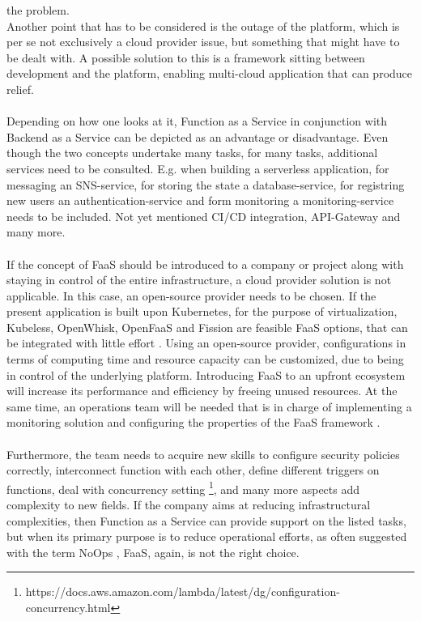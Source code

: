 \documentclass[11pt]{article}
\begin{document}
the problem.\\Another point that has to be considered is the outage of the platform, which is per se not exclusively a cloud provider issue, but something that might have to be dealt with. A possible solution to this is a framework sitting between development and the platform, enabling multi-cloud application that can produce relief.\\\\ Depending on how one looks at it, Function as a Service in conjunction with Backend as a Service can be depicted as an advantage or disadvantage. Even though the two concepts undertake many tasks, for many tasks, additional services need to be consulted. E.g. when building a serverless application, for messaging an SNS-service, for storing the state a database-service, for registring new users an authentication-service and form monitoring a monitoring-service needs to be included. Not yet mentioned CI/CD integration, API-Gateway and many more.\\\\ If the concept of FaaS should be introduced to a company or project along with staying in control of the entire infrastructure, a cloud provider solution is not applicable. In this case, an open-source provider needs to be chosen. If the present application is built upon Kubernetes, for the purpose of virtualization, Kubeless, OpenWhisk, OpenFaaS and Fission are feasible FaaS options, that can be integrated with little effort \cite{palade2019evaluation}. Using an open-source provider, configurations in terms of computing time and resource capacity can be customized, due to being in control of the underlying platform. Introducing FaaS to an upfront ecosystem will increase its performance and efficiency by freeing unused resources. At the same time, an operations team will be needed that is in charge of implementing a monitoring solution and configuring the properties of the FaaS framework \cite{mohanty2018evaluation}.\\\\ Furthermore, the team needs to acquire new skills to configure security policies correctly, interconnect function with each other, define different triggers on functions, deal with concurrency setting \footnote{https://docs.aws.amazon.com/lambda/latest/dg/configuration-concurrency.html}, and many more aspects add complexity to new fields. If the company aims at reducing infrastructural complexities, then Function as a Service can provide support on the listed tasks, but when its primary purpose is to reduce operational efforts, as often suggested with the term \glqq NoOps\grqq{} \cite{eivy2017wary}, FaaS, again, is not the right choice.
\end{document}

